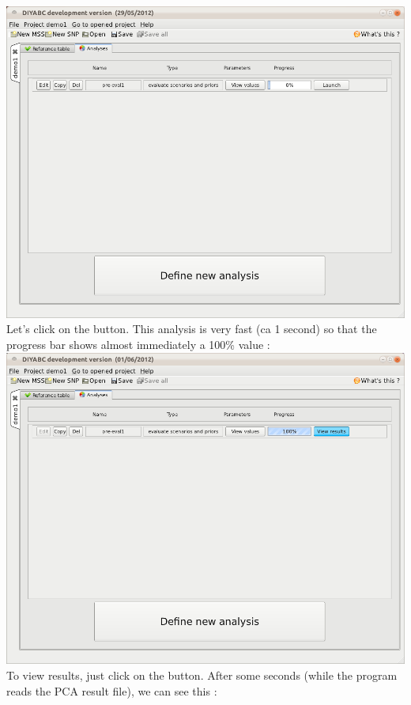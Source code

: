 \includegraphics[scale=0.35]{gui_pictures/Capture-DIYABC-30} \\


Let's click on the  button. This analysis
is very fast (ca 1 second) so that the progress bar shows almost immediately
a 100\% value : \\


\includegraphics[scale=0.35]{gui_pictures/Capture-DIYABC-31} \\


To view results, just click on the 
button. After some seconds (while the program reads the PCA result
file), we can see this : \\



